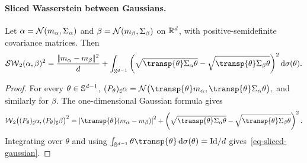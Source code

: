 \paragraph{Sliced Wasserstein between Gaussians.}
\begin{prop}\label{prop-sliced-gaussian}
Let $\alpha=\mathcal{N}(m_\alpha,\Sigma_\alpha)$ and
$\beta=\mathcal{N}(m_\beta,\Sigma_\beta)$ on $\mathbb{R}^d$, with positive-semidefinite
covariance matrices. Then
\begin{equation}\label{eq-sliced-gaussian}
\SW_2(\alpha,\beta)^2
=
\frac{\norm{m_\alpha-m_\beta}^2}{d}
+
\int_{\Sphere^{d-1}}
\pa{
\sqrt{\transp{\theta}\Sigma_\alpha\theta}
-
\sqrt{\transp{\theta}\Sigma_\beta\theta}
}^2
\d\sigma(\theta).
\end{equation}
\end{prop}
\begin{proof}
For every $\theta\in\mathbb{S}^{d-1}$, \((P_\theta)_\sharp\alpha = \Gaussian\bigl(\transp{\theta}m_\alpha, \transp{\theta}\Sigma_\alpha\theta\bigr),\)
and similarly for $\beta$. The one-dimensional Gaussian formula gives
\[
\Wass_2\bigl((P_\theta)_\sharp\alpha,
(P_\theta)_\sharp\beta\bigr)^2
=
\abs{\transp{\theta}(m_\alpha-m_\beta)}^2
+
\pa{
\sqrt{\transp{\theta}\Sigma_\alpha\theta}
-
\sqrt{\transp{\theta}\Sigma_\beta\theta}
}^2.
\]
Integrating over $\theta$ and using
$\int_{\Sphere^{d-1}}\theta\transp{\theta}\,\d\sigma(\theta)=\Id/d$
gives~\eqref{eq-sliced-gaussian}.
\end{proof}

